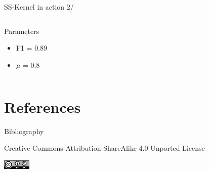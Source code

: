\documentclass[10pt,aspectratio=1610]{beamer}
\begin{document}
\begin{frame}[label={sec:orgfff130f}]{SS-Kernel in action 2/}
\begin{columns}
\begin{column}{0.3\columnwidth}
\begin{block}{Parameters}
\begin{itemize}
\item F1 = 0.89
\item \(\mu\) = 0.8
\end{itemize}
\end{block}
\end{column}
\end{columns}
\end{frame}

\section{References}
\label{sec:org3281717}
\begin{frame}[fragile,allowframebreaks,label=]{Bibliography}
\printbibliography
\end{frame}
\begin{frame}[label={sec:orgf92bf57}]{}
\begin{center}
\tiny Creative Commons Attribution-ShareAlike 4.0 Unported License
\normalsize

\begin{center}
\includegraphics[width=0.1\textwidth]{figures/cc-by-sa.png}
\end{center}
\end{center}
\end{frame}
\end{document}
